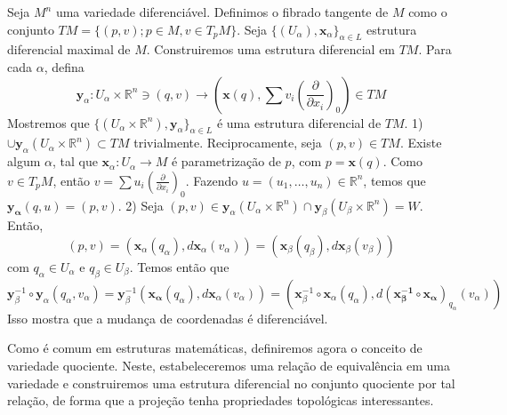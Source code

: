 \begin{definition}
    \label{loc:exemplos_de_variedades.fibrado_tangente}
    Seja $M^{n}$ uma variedade diferenciável. Definimos o fibrado tangente de $M$ como o conjunto $TM=\{ (p, v); p \in M, v \in T_{p}M \}$.
    Seja $\{ (U_{\alpha}), \mathbf{x}_{\alpha} \}_{\alpha \in L}$ estrutura diferencial maximal de $M$. Construiremos uma estrutura diferencial em $TM$. Para cada $\alpha$, defina
    \begin{equation*}
        \mathbf{y}_{\alpha}:U_{\alpha}\times \mathbb{R}^{n} \ni (q, v) \to \left( \mathbf{x}(q), \sum v_{i}\left( \frac{\partial}{\partial x_{i}} \right)_{0} \right) \in TM
    \end{equation*}
    Mostremos que $\{ (U_{\alpha}\times \mathbb{R}^{n}), \mathbf{y}_{\alpha} \}_{\alpha \in L}$ é uma estrutura diferencial de $TM$.
    1) $\cup \mathbf{y}_{\alpha}(U_{\alpha}\times \mathbb{R}^{n}) \subset TM$ trivialmente. Reciprocamente, seja $(p, v) \in TM$. Existe algum $\alpha$, tal que $\mathbf{x}_{\alpha}:U_{\alpha}\to M$ é parametrização de $p$, com $p=\mathbf{x}(q)$. Como $v \in T_{p}M$, então $v=\sum u_{i}\left( \frac{\partial}{\partial x_{i}} \right)_{0}$. Fazendo $u=(u_{1}, \dots, u_{n}) \in \mathbb{R}^{n}$, temos que $\mathbf{y_{\alpha}}(q, u)= (p, v)$.
    2) Seja $(p, v) \in \mathbf{y}_{\alpha}(U_{\alpha}\times \mathbb{R}^{n}) \cap \mathbf{y}_{\beta}(U_{\beta}\times \mathbb{R}^{n})=W$. Então,
    \begin{equation*}
        (p, v)=(\mathbf{x}_{\alpha}(q_{\alpha}), d\mathbf{x}_{\alpha}(v_{\alpha}))=(\mathbf{x}_{\beta}(q_{\beta}), d\mathbf{x}_{\beta}(v_{\beta}))
    \end{equation*}
    com $q_{\alpha} \in U_{\alpha}$ e $q_{\beta} \in U_{\beta}$. Temos então que
    \begin{equation*}
        \mathbf{y}_{\beta}^{-1} \circ \mathbf{y}_{\alpha}(q_{\alpha}, v_{\alpha})=\mathbf{y}_{\beta}^{-1}(\mathbf{x_{\alpha}}(q_{\alpha}), d\mathbf{x}_{\alpha}(v_{\alpha})) = (\mathbf{x}_{\beta}^{-1} \circ  \mathbf{x}_{\alpha}(q_{\alpha}), d(\mathbf{x_{\beta}^{-1}} \circ  \mathbf{x_{\alpha}})_{q_{\alpha}}(v_{\alpha}))
    \end{equation*}
    Isso mostra que a mudança de coordenadas é diferenciável.
\end{definition}
Como é comum em estruturas matemáticas, definiremos agora o conceito de variedade quociente. Neste, estabeleceremos uma relação de equivalência em uma variedade e construiremos uma estrutura diferencial no conjunto quociente por tal relação, de forma que a projeção tenha propriedades topológicas interessantes.

